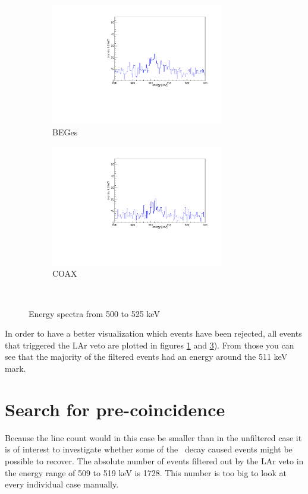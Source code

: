 \documentclass[encoding=utf8,british]{tumphthesis}
\begin{document}
\begin{figure}[t!]
	\centering
	\begin{subfigure}{.5\textwidth}
		\includegraphics[width=75mm]{./Bilder/AntiLArBEGe.pdf}
		\caption{BEGes}
		\label{fig:AntiLArBEGes}
	\end{subfigure}\hfill%
	\begin{subfigure}{.5\textwidth}
		\includegraphics[width=75mm]{./Bilder/AntiLArCOAX.pdf}
		\caption{COAX}
		\label{fig:AntiLArCOAX}
	\end{subfigure}
	\\
	\vspace{0.5cm}
	\caption{Energy spectra from 500 to 525 keV }
\end{figure}

In order to have a better visualization which events have been rejected, all events that triggered the LAr veto are plotted in figures \ref{fig:AntiLArBEGes} and \ref{fig:AntiLArCOAX}).
From those you can see that the majority of the filtered events had an energy around the 511 keV mark.
\\

\section{Search for pre-coincidence}
\label{sec:precoince}

Because the line count would in this case be smaller than in the unfiltered case it is of interest to investigate whether some of the \Kr\ decay caused events might be possible to recover.
The absolute number of events filtered out by the LAr veto in the energy range of 509 to 519 keV is 1728.
This number is too big to look at every individual case manually.
\\
\end{document}
